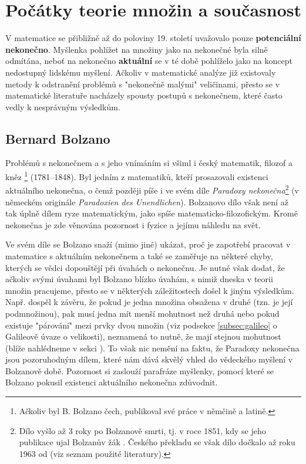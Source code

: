 \section{Počátky teorie množin a současnost}

V matematice se přibližně až do poloviny 19. století uvažovalo pouze \textbf{potenciální nekonečno}. Myšlenka pohlížet na množiny jako na nekonečné byla silně odmítána, neboť na nekonečno \textbf{aktuální} se v té době pohlíželo jako na koncept nedostupný lidskému myšlení. Ačkoliv v matematické analýze již existovaly metody k odstranění problémů s "nekonečně malými" veličinami, přesto se v matematické literatuře nacházely spousty postupů s nekonečnem, které často vedly k nesprávným výsledkům.
\subsection{Bernard Bolzano}
Problémů s nekonečnem a s jeho vnímáním si všiml i český matematik, filozof a kněz \footnote{Ačkoliv byl B. Bolzano čech, publikoval své práce v němčině a latině.} (1781--1848). Byl jedním z matematiků, kteří prosazovali existenci aktuálního nekonečna, o čemž později píše i ve svém díle \emph{Paradoxy nekonečna}\footnote{Dílo vyšlo až 3 roky po Bolzanově smrti, tj. v roce 1851, kdy se jeho publikace ujal Bolzanův žák . Českého překladu se však dílo dočkalo až roku 1963 od  (viz seznam použité literatury).} (v německém originále \emph{Paradoxien des Unendlichen}). Bolzanovo dílo však není až tak úplně dílem ryze matematickým, jako spíše matematicko-filozofickým. Kromě nekonečna je zde věnována pozornost i fyzice a jejímu náhledu na svět.

Ve svém díle se Bolzano snaží (mimo jiné) ukázat, proč je zapotřebí pracovat v matematice s aktuálním nekonečnem a také se zaměřuje na některé chyby, kterých se vědci dopouštějí při úvahách o nekonečnu. Je nutné však dodat, že ačkoliv svými úvahami byl Bolzano blízko úvahám, s nimiž dneska v teorii množin pracujeme, přesto se v některých záležitostech došel k jiným výsledkům. Např. dospěl k závěru, že pokud je jedna množina obsažena v druhé (tzn. je její podmnožinou), pak musí jedna mít menší mohutnost než druhá nebo pokud existuje "párování" mezi prvky dvou množin (viz podsekce \ref{subsec:galileo}
o Galileově úvaze o velikosti), neznamená to nutně, že mají stejnou mohutnost (blíže nahlédneme v sekci ). To však nic nemění na faktu, že Paradoxy nekonečna jsou pozoruhodným dílem, které nám dává skvělý vhled do vědeckého myšlení v Bolzanově době. Pozornost si zaslouží parafráze myšlenky, pomocí které se Bolzano pokusil existenci aktuálního nekonečna zdůvodnit.

